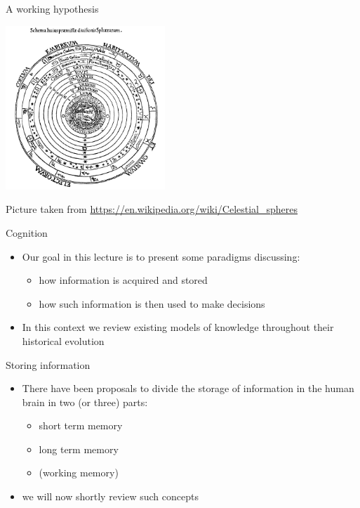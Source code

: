 \documentclass{beamer}
\begin{document}
\begin{frame}
{\centerline{A working hypothesis}}

\begin{center}

 \includegraphics[width=6cm]{P2023.AIBCCSS.KnowledgeAcquisitionRetentionUse/Ptolemaicsystem.png}
 
 \end{center}


\begin{center}
    \tiny{Picture taken from \url{https://en.wikipedia.org/wiki/Celestial_spheres}}
\end{center}
\end{frame}


\begin{frame}
{\centerline{Cognition}}
\begin{itemize}
    \item Our goal in this lecture is to present some paradigms discussing:
    \begin{itemize}
        \item how information is acquired and stored
        \item how such information is then used to make decisions
    \end{itemize}
    \item In this context we review existing models of knowledge throughout their historical evolution
\end{itemize} 
\end{frame}

\begin{frame}
{\centerline{Storing information}}
\begin{itemize}
    \item There have been proposals to divide the storage of information in the human brain in two (or three) parts:
    \begin{itemize}
        \item short term memory
        \item long term memory
        \item (working memory)
    \end{itemize}
    \item we will now shortly review such concepts
\end{itemize} 
\end{frame}
\end{document}

